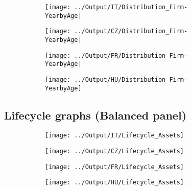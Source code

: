 \documentclass[12pt,notitlepage]{article}
\begin{document}
\begin{figure}[!htpb]
\centering
\caption{Firm age and Assets}
\begin{subfigure}{.49\textwidth}
    \centering
 \texttt{[image: ../Output/IT/Distribution\_Firm-YearbyAge]}
\end{subfigure}
\begin{subfigure}{.49\textwidth}
    \centering
 \texttt{[image: ../Output/CZ/Distribution\_Firm-YearbyAge]}
\end{subfigure}
\begin{subfigure}{.49\textwidth}
    \centering
 \texttt{[image: ../Output/FR/Distribution\_Firm-YearbyAge]}
\end{subfigure}%
\begin{subfigure}{.49\textwidth}
    \centering
 \texttt{[image: ../Output/HU/Distribution\_Firm-YearbyAge]}
\end{subfigure}
\end{figure}
\pagebreak

\subsection*{Lifecycle graphs (Balanced panel)}

\begin{figure}[!htpb]
\centering
\caption{Firm age and Assets}
\begin{subfigure}{.49\textwidth}
    \centering
 \texttt{[image: ../Output/IT/Lifecycle\_Assets]}
\end{subfigure}%
\begin{subfigure}{.49\textwidth}
    \centering
 \texttt{[image: ../Output/CZ/Lifecycle\_Assets]}
\end{subfigure}
\begin{subfigure}{.49\textwidth}
    \centering
 \texttt{[image: ../Output/FR/Lifecycle\_Assets]}
\end{subfigure}%
\begin{subfigure}{.49\textwidth}
    \centering
 \texttt{[image: ../Output/HU/Lifecycle\_Assets]}
\end{subfigure}
\end{figure}
\pagebreak
\end{document}
